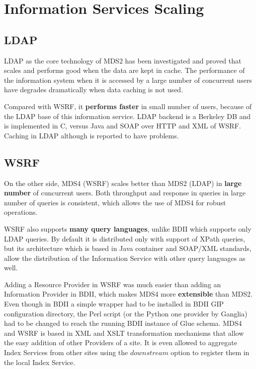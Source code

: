 \section{Information Services Scaling}

\subsection{LDAP}

LDAP as the core technology of MDS2 has been investigated \cite{zhang2004performance} and proved that scales and performs good when the data are kept in cache. The performance of the information system when it is accessed by a large number of concurrent users have degrades dramatically when data caching is not used.

Compared with WSRF, it {\bf performs faster} \cite{schopf2006monitoring} in small number of users, because of the LDAP base of this information service. LDAP backend is a Berkeley DB and is implemented in C, versus Java and SOAP over HTTP and XML of WSRF. Caching in LDAP although is reported to have problems.

\subsection{WSRF}

On the other side, MDS4 (WSRF) scales better than MDS2 (LDAP) in {\bf large number} of cuncurrent users. Both throughput and response in queries in large number of queries is consistent, which allows the use of MDS4 for robust operations.

WSRF also supports {\bf many query languages}, unlike BDII which supports only LDAP queries. By default it is distributed only with support of XPath queries, but its architecture which is based in Java container and SOAP/XML standards, allow the distribution of the Information Service with other query languages as well.

Adding a Resource Provider in WSRF was much easier than adding an Information Provider in BDII, which makes MDS4 more {\bf extensible} than MDS2. Even though in BDII a simple wrapper had to be installed in BDII GIP configuration directory, the Perl script (or the Python one provider by Ganglia) had to be changed to reach the running BDII instance of Glue schema. MDS4 and WSRF is based in XML and XSLT transformation mechanisms that allow the easy addition of other Providers of a site. It is even allowed to aggregate Index Services from other sites using the $downstream$ option to register them in the local Index Service.


